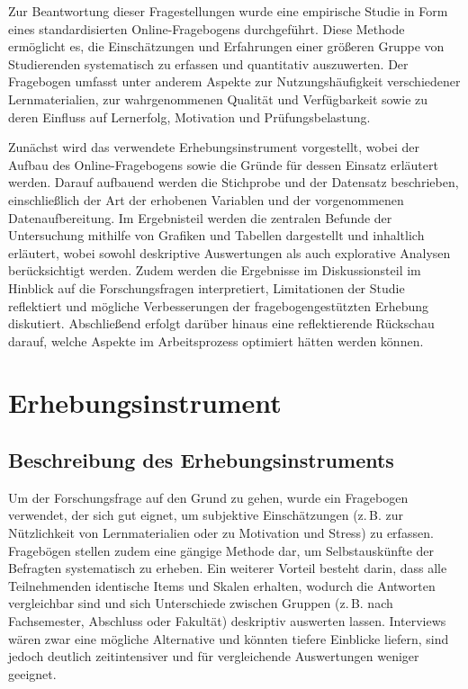 \documentclass[a4paper,12pt]{article}
\begin{document}
Zur Beantwortung dieser Fragestellungen wurde eine empirische Studie in Form eines standardisierten Online-Fragebogens durchgeführt. Diese Methode ermöglicht es, die Einschätzungen und Erfahrungen einer größeren Gruppe von Studierenden systematisch zu erfassen und quantitativ auszuwerten. Der Fragebogen umfasst unter anderem Aspekte zur Nutzungshäufigkeit verschiedener Lernmaterialien, zur wahrgenommenen Qualität und Verfügbarkeit sowie zu deren Einfluss auf Lernerfolg, Motivation und Prüfungsbelastung.

Zunächst wird das verwendete Erhebungsinstrument vorgestellt, wobei der Aufbau des Online-Fragebogens sowie die Gründe für dessen Einsatz erläutert werden. Darauf aufbauend werden die Stichprobe und der Datensatz beschrieben, einschließlich der Art der erhobenen Variablen und der vorgenommenen Datenaufbereitung. Im Ergebnisteil werden die zentralen Befunde der Untersuchung mithilfe von Grafiken und Tabellen dargestellt und inhaltlich erläutert, wobei sowohl deskriptive Auswertungen als auch explorative Analysen berücksichtigt werden. Zudem werden die Ergebnisse im Diskussionsteil im Hinblick auf die Forschungsfragen interpretiert, Limitationen der Studie reflektiert und mögliche Verbesserungen der fragebogengestützten Erhebung diskutiert. Abschließend erfolgt darüber hinaus eine reflektierende Rückschau darauf, welche Aspekte im Arbeitsprozess optimiert hätten werden können.


\section{Erhebungsinstrument}

\subsection{Beschreibung des Erhebungsinstruments}

Um der Forschungsfrage auf den Grund zu gehen, wurde ein Fragebogen verwendet, der sich gut eignet, um subjektive Einschätzungen (z.\,B. zur Nützlichkeit von Lernmaterialien oder zu Motivation und Stress) zu erfassen. Fragebögen stellen zudem eine gängige Methode dar, um Selbstauskünfte der Befragten systematisch zu erheben. Ein weiterer Vorteil besteht darin, dass alle Teilnehmenden identische Items und Skalen erhalten, wodurch die Antworten vergleichbar sind und sich Unterschiede zwischen Gruppen (z.\,B. nach Fachsemester, Abschluss oder Fakultät) deskriptiv auswerten lassen. Interviews wären zwar eine mögliche Alternative und könnten tiefere Einblicke liefern, sind jedoch deutlich zeitintensiver und für vergleichende Auswertungen weniger geeignet.
\end{document}
